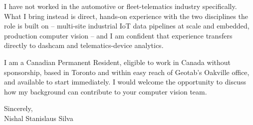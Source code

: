 \documentclass[11pt]{article}
\begin{document}
\vspace{1em}

\noindent I have not worked in the automotive or fleet-telematics industry specifically. What I bring instead is direct, hands-on experience with the two disciplines the role is built on -- multi-site industrial IoT data pipelines at scale and embedded, production computer vision -- and I am confident that experience transfers directly to dashcam and telematics-device analytics.

\vspace{1em}

\noindent I am a Canadian Permanent Resident, eligible to work in Canada without sponsorship, based in Toronto and within easy reach of Geotab's Oakville office, and available to start immediately. I would welcome the opportunity to discuss how my background can contribute to your computer vision team.

\vspace{1em}

\noindent Sincerely, \\
Nishal Stanislaus Silva
\end{document}
